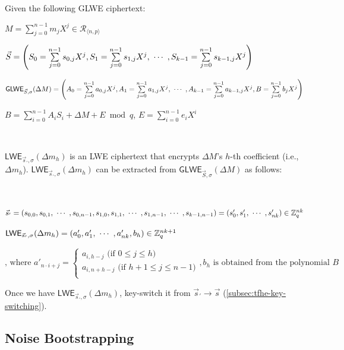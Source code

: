 \begin{tcolorbox}[title={\textbf{\tboxlabel{\ref*{subsec:tfhe-extraction}} GLWE Ciphertext's Coefficient Extraction}}]
Given the following GLWE ciphertext: 

$M = \sum\limits_{j=0}^{n-1}m_jX^j \in \mathcal{R}_{\langle n, p \rangle}$

$\vec{S} = \left(S_0 = \sum\limits_{j=0}^{n-1}s_{0,j}X^j, S_1 = \sum\limits_{j=0}^{n-1}s_{1,j}X^j, \text{ } \text{$\cdots$} \text{ }, S_{k-1} = \sum\limits_{j=0}^{n-1}s_{k-1,j}X^j \right)$

$\textsf{GLWE}_{\vec{S}, \sigma}(\Delta M) = \left(A_0 = \sum\limits_{j=0}^{n-1}a_{0,j}X^j, A_1 = \sum\limits_{j=0}^{n-1}a_{1,j}X^j, \text{ } \text{$\cdots$} \text{ }, A_{k-1} = \sum\limits_{j=0}^{n-1}a_{k-1,j}X^j, B = \sum\limits_{j=0}^{n-1}b_{j}X^j\right)$

$B = \sum\limits_{i=0}^{n-1}A_iS_i + \Delta M + E \bmod q$, \text{ } $E = \sum\limits_{i=0}^{n-1}e_iX^i$

$ $

$\textsf{LWE}_{\vec{s}_{'}, \sigma}(\Delta m_h)$ is an LWE ciphertext that encrypts $\Delta M$'s $h$-th coefficient (i.e., $\Delta m_h$). $\textsf{LWE}_{\vec{s}_{'}, \sigma}(\Delta m_h)$ can be extracted from $\textsf{GLWE}_{\vec{S}, \sigma}(\Delta M)$ as follows: 

$ $

$\vec{s}_{'} = (s_{0,0}, s_{0,1}, \text{ } \text{$\cdots$} \text{ }, s_{0,n-1}, s_{1,0}, s_{1,1}, \text{ } \text{$\cdots$} \text{ }, s_{1, n-1}, \text{ } \text{$\cdots$} \text{ }, s_{k-1, n-1}) = (s'_0, s'_1, \text{ } \text{$\cdots$} \text{ }, s'_{nk} ) \in \mathbb{Z}_q^{nk}$

$\textsf{LWE}_{\vec{s}_{'}, \sigma}(\Delta m_h) = (a_0', a_1', \text{ } \text{$\cdots$} \text{ } , a_{nk}', b_h) \in \mathbb{Z}_q^{nk + 1}$


\[
    \text{, where } a'_{n \cdot i + j} =   
\begin{cases}
    a_{i,h - j} \text{ (if } 0 \leq j \leq h\text{)}\\
    a_{i,n + h - j} \text{ (if } h+1 \leq j \leq n-1\text{)}\\
\end{cases}
, b_h \text{ is obtained from the polynomial } B
\]

Once we have $\textsf{LWE}_{\vec{s}_{'}, \sigma}(\Delta m_h)$, key-switch it from $\vec{s}_{'} \rightarrow \vec{s}$ (\autoref{subsec:tfhe-key-switching}).

\end{tcolorbox}



\subsection{Noise Bootstrapping}
\label{subsec:tfhe-noise-bootstrapping}


